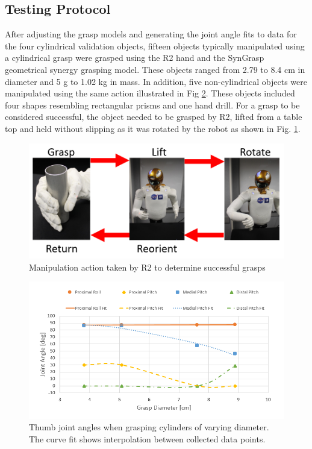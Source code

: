 \documentclass[runningheads,a4paper]{llncs}
\begin{document}
\subsection{Testing Protocol}
After adjusting the grasp models and generating the joint angle fits to data for the four cylindrical validation objects, fifteen objects typically manipulated using a cylindrical grasp were grasped using the R2 hand and the SynGrasp geometrical synergy grasping model. These objects ranged from 2.79 to 8.4 cm in diameter and 5 g to 1.02 kg in mass. In addition, five non-cylindrical objects were manipulated using the same action illustrated in Fig \ref{thumb_fits}. These objects included four shapes resembling rectangular prisms and one hand drill. For a grasp to be considered successful, the object needed to be grasped by R2, lifted from a table top and held without slipping as it was rotated by the robot as shown in Fig. \ref{testing}.

\begin{figure}[!b]
 \centering
 \includegraphics[width=\linewidth]{manipulation}
 \caption{Manipulation action taken by R2 to determine successful grasps}
 \label{testing}
\end{figure}

\begin{figure}[!b]
 \centering
 \includegraphics[width=1.08\linewidth]{thumb_fits_3}
 \caption{Thumb joint angles when grasping cylinders of varying diameter. The curve fit shows interpolation between collected data points.}
 \label{thumb_fits} 
\end{figure}
\end{document}
